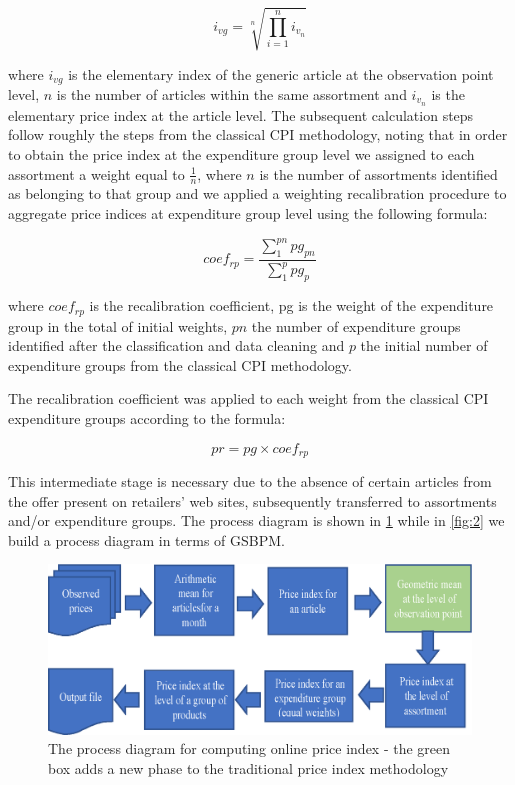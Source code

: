\documentclass[]{article}
\begin{document}
\begin{equation}\label{eq:1}
i_{vg} = \sqrt[n]{\prod_{i=1}^{n} i_{v_{n}}}
\end{equation}


where $i_{vg}$ is the elementary index of the generic article at the observation point level, $n$ is the number of 
articles within the same assortment and $i_{v_{n}}$ is the elementary price index at the article level. 
The subsequent calculation steps follow roughly the steps from the classical CPI methodology, noting that in order 
to obtain the price index at the expenditure group level we assigned to each assortment a weight equal to $\frac{1}{n}$,
where $n$ is the number of assortments identified as belonging to that group and we applied a weighting 
recalibration procedure to aggregate price indices at expenditure group level using the following formula:


\begin{equation}\label{eq:2}
coef_{rp} = \frac{\sum_1^{pn}{pg_{pn}}}{\sum_1^p{pg_{p}}}
\end{equation}


where $coef_{rp}$  is the recalibration coefficient, pg is the weight of the expenditure group in the total of 
initial weights, $pn$ the number of expenditure groups identified after the classification and data cleaning 
and $p$ the initial number of expenditure groups from the classical CPI methodology.


The recalibration coefficient was applied to each weight from the classical CPI expenditure groups according to the formula:


\begin{equation}\label{eq:3}
pr = pg \times coef_{rp}
\end{equation}


This intermediate stage is necessary due to the absence of certain articles from the offer present on retailers' web sites, subsequently transferred to assortments and/or expenditure groups.
The process diagram is shown in \ref{fig:1} while in \ref{fig:2} we build a process diagram in terms of GSBPM.


\begin{figure}
	\centering
	\includegraphics[width=0.7\linewidth]{fig1.eps}
	\caption{The process diagram for computing online price index - the green box adds a new phase to the traditional price index methodology}
	\label{fig:1}
\end{figure}
\end{document}
